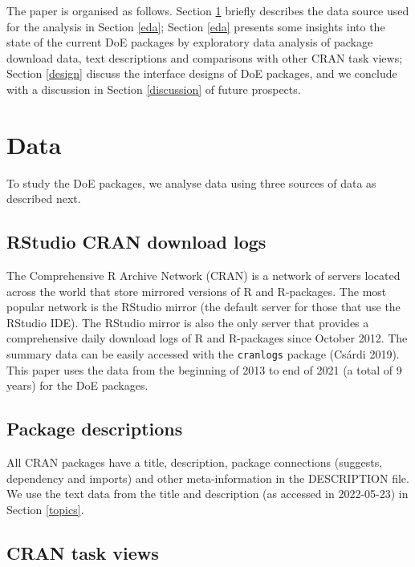 \documentclass{article}
\begin{document}
The paper is organised as follows. Section \ref{data} briefly describes
the data source used for the analysis in Section \ref{eda}; Section
\ref{eda} presents some insights into the state of the current DoE
packages by exploratory data analysis of package download data, text
descriptions and comparisons with other CRAN task views; Section
\ref{design} discuss the interface designs of DoE packages, and we
conclude with a discussion in Section \ref{discussion} of future
prospects.

\hypertarget{data}{%
\section{Data}\label{data}}

To study the DoE packages, we analyse data using three sources of data
as described next.

\hypertarget{rstudio-cran-download-logs}{%
\subsection{RStudio CRAN download
logs}\label{rstudio-cran-download-logs}}

The Comprehensive R Archive Network (CRAN) is a network of servers
located across the world that store mirrored versions of R and
R-packages. The most popular network is the RStudio mirror (the default
server for those that use the RStudio IDE). The RStudio mirror is also
the only server that provides a comprehensive daily download logs of R
and R-packages since October 2012. The summary data can be easily
accessed with the \texttt{cranlogs} package (Csárdi 2019). This paper
uses the data from the beginning of 2013 to end of 2021 (a total of 9
years) for the DoE packages.

\hypertarget{package-descriptions}{%
\subsection{Package descriptions}\label{package-descriptions}}

All CRAN packages have a title, description, package connections
(suggests, dependency and imports) and other meta-information in the
DESCRIPTION file. We use the text data from the title and description
(as accessed in 2022-05-23) in Section \ref{topics}.

\hypertarget{cran-task-views}{%
\subsection{CRAN task views}\label{cran-task-views}}
\end{document}
